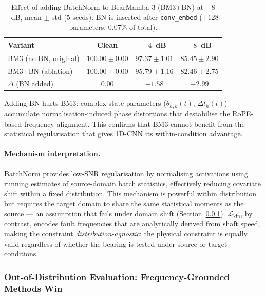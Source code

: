 \begin{table}[htbp]
\centering
\caption{Effect of adding BatchNorm to BearMamba-3 (BM3+BN) at $-8$~dB,
         mean $\pm$ std (5 seeds). BN is inserted after \texttt{conv\_embed}
         ($+128$ parameters, $0.07\%$ of total).}
\label{tab:bm3bn_cwru}
\begin{tabular}{lccc}
\toprule
Variant & Clean & $-4$~dB & $-8$~dB \\
\midrule
BM3 (no BN, original)   & $100.00 \pm 0.00$ & $97.37 \pm 1.01$ & $85.45 \pm 2.90$ \\
BM3+BN (ablation)        & $100.00 \pm 0.00$ & $95.79 \pm 1.16$ & $82.46 \pm 2.75$ \\
\midrule
$\Delta$ (BN added)      & $0.00$             & $-1.58$           & $-2.99$ \\
\bottomrule
\end{tabular}
\begin{tablenotes}
\item Adding BN hurts BM3: complex-state parameters ($\theta_{h,k}(t)$,
  $\Delta t_h(t)$) accumulate normalisation-induced phase distortions
  that destabilise the RoPE-based frequency alignment.
  This confirms that BM3 cannot benefit from the statistical regularisation
  that gives 1D-CNN its within-condition advantage.
\end{tablenotes}
\end{table}

\paragraph{Mechanism interpretation.}
BatchNorm provides low-SNR regularisation by normalising activations using
running estimates of source-domain batch statistics, effectively reducing
covariate shift within a fixed distribution.
This mechanism is powerful within distribution but requires the target
domain to share the same statistical moments as the source — an assumption
that fails under domain shift (Section~\ref{subsubsec:ood_evaluation}).
$\mathcal{L}_{\text{kin}}$, by contrast, encodes fault frequencies that are
analytically derived from shaft speed, making the constraint
\emph{distribution-agnostic}: the physical constraint is equally valid
regardless of whether the bearing is tested under source or target conditions.

\subsubsection{Out-of-Distribution Evaluation: Frequency-Grounded Methods Win}
\label{subsubsec:ood_evaluation}


